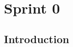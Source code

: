\chapter{Sprint 0}

\newpage

\lhead{\leftmark}
\cfoot{\thepage}


\parindent=0.5in


\section{Introduction}